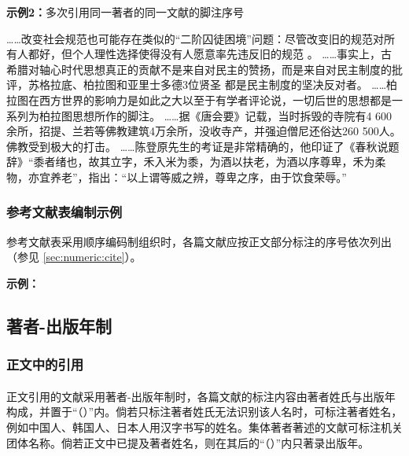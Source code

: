 \documentclass[twoside]{article}%
\begin{document}
\begin{refsection}
\textbf{示例2：}多次引用同一著者的同一文献的脚注序号

\renewcommand{\thempfootnote}{\arabic{mpfootnote}}
\smallskip\noindent\begin{minipage}{\textwidth}\renewcommand{\thempfootnote}{\arabic{mpfootnote}}
\hspace{2em}……改变社会规范也可能存在类似的“二阶囚徒困境”问题：尽管改变旧的规范对所有人都好，但个人理性选择使得没有人愿意率先违反旧的规范
。
……事实上，古希腊对轴心时代思想真正的贡献不是来自对民主的赞扬，而是来自对民主制度的批评，苏格拉底、柏拉图和亚里士多德3位贤圣
都是民主制度的坚决反对者。
……柏拉图在西方世界的影响力是如此之大以至于有学者评论说，一切后世的思想都是一系列为柏拉图思想所作的脚注。
……据《唐会要》记载，当时拆毁的寺院有4 600余所，招提、兰若等佛教建筑4万余所，没收寺产，并强迫僧尼还俗达260 500人。
佛教受到极大的打击。
……陈登原先生的考证是非常精确的，他印证了《春秋说题辞》“黍者绪也，故其立字，禾入米为黍，为酒以扶老，为酒以序尊卑，禾为柔物，亦宜养老”，指出：“以上谓等威之辨，尊卑之序，由于饮食荣辱。”
\end{minipage}
\end{refsection}

\subsubsection{参考文献表编制示例}

参考文献表采用顺序编码制组织时，各篇文献应按正文部分标注的序号依次列出（参见 \ref{sec:numeric:cite}）。

\begin{refsection}
\textbf{示例：}

\nocite{Baker1995--,Chernik1982--,尼葛洛庞帝1996--,汪冰1997-16-16,杨宗英1996-24-29,Dowler1995-5-26}

\printbibliography[heading=none,env=indentegenv]
\end{refsection}


\subsection{著者-出版年制}
\subsubsection{正文中的引用}\label{sec:ay:citation}
\paragraph{}\label{sec:ay:citename} 正文引用的文献采用著者-出版年制时，各篇文献的标注内容由著者姓氏与出版年构成，并置于“（）”内。倘若只标注著者姓氏无法识别该人名时，可标注著者姓名，例如中国人、韩国人、日本人用汉字书写的姓名。集体著者著述的文献可标注机关团体名称。倘若正文中已提及著者姓名，则在其后的“（）”内只著录出版年。
\end{document}
